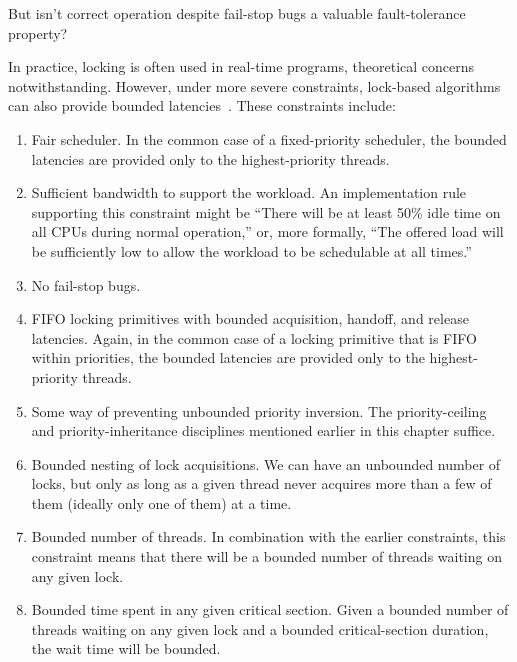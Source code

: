 \QuickQuiz{}
	But isn't correct operation despite fail-stop bugs
	a valuable fault-tolerance property?
 \QuickQuizEnd

In practice, locking is often used in real-time programs, theoretical
concerns notwithstanding.
However, under more severe constraints, lock-based
algorithms can also provide bounded latencies~\cite{BjoernBrandenburgPhD}.
These constraints include:

\begin{enumerate}
\item	Fair scheduler.
	In the common case of a fixed-priority scheduler, the bounded
	latencies are provided only to the highest-priority threads.
\item	Sufficient bandwidth to support the workload.
	An implementation rule supporting this constraint might be
	``There will be at least 50\% idle time on all CPUs
	during normal operation,''
	or, more formally, ``The offered load will be sufficiently low
	to allow the workload to be schedulable at all times.''
\item	No fail-stop bugs.
\item	FIFO locking primitives with bounded acquisition, handoff,
	and release latencies.
	Again, in the common case of a locking primitive that is FIFO
	within priorities, the bounded latencies are provided only
	to the highest-priority threads.
\item	Some way of preventing unbounded priority inversion.
	The priority-ceiling and priority-inheritance disciplines
	mentioned earlier in this chapter suffice.
\item	Bounded nesting of lock acquisitions.
	We can have an unbounded number of locks, but only as long as a
	given thread never acquires more than a few of them (ideally only
	one of them) at a time.
\item	Bounded number of threads.
	In combination with the earlier constraints, this constraint means
	that there will be a bounded number of threads waiting on any
	given lock.
\item	Bounded time spent in any given critical section.
	Given a bounded number of threads waiting on any given lock and
	a bounded critical-section duration, the wait time will be bounded.
\end{enumerate}

